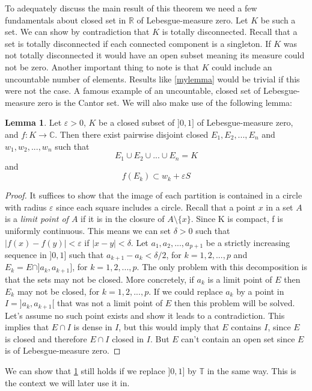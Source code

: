 \documentclass[a4paper,12pt,twoside,BCOR=10mm]{scrbook}
\theoremstyle{definition}
\theoremstyle{definition}
\newtheorem{lemma}[theorem]{Lemma}
\theoremstyle{definition}
\begin{document}
To adequately discuss the main result of this theorem we need a few fundamentals about closed set in $\mathbb{R}$ of Lebesgue-measure zero.
Let $K$ be such a set.
We can show by contradiction that $K$ is totally disconnected.
Recall that a set is totally disconnected if each connected component is a singleton.
If $K$ was not totally disconnected it would have an open subset meaning its measure could not be zero.
Another important thing to note is that $K$ could include an uncountable number of elements.
Results like \ref{mylemma} would be trivial if this were not the case.
A famous example of an uncountable, closed set of Lebesgue-measure zero is the Cantor set.
We will also make use of the following lemma:
\begin{lemma}
\label{somelemma}
Let
	$\varepsilon > 0$,
	$K$ be a closed subset of $]0, 1]$ of Lebesgue-measure zero,
	and $f: K \rightarrow \mathbb{C}$.
Then there exist pairwise disjoint closed $E_1, E_2, ..., E_n$ and $w_1, w_2, ..., w_n$ such that 
\[
	E_1 \cup E_2 \cup ... \cup E_n = K
\]
and
\[
	f(E_k) \subset w_k + \varepsilon S \tag*{$k = 1, 2, ..., n$.}
\]
\end{lemma}
\begin{proof}
It suffices to show that the image of each partition is contained in a circle with radius $\varepsilon$ since each square includes a circle.
Recall that a point $x$ in a set $A$ is a \emph{limit point of $A$} if it is in the closure of $A \setminus \{x\}$.
Since K is compact, f is uniformly continuous.
This means we can set $\delta > 0$ such that $|f(x) - f(y)| < \varepsilon$ if $|x - y| < \delta$.
Let $a_1, a_2, ..., a_{p + 1}$ be a strictly increasing sequence in $]0, 1]$ such that $a_{k + 1} - a_k < \delta/2$, for $k = 1, 2, ..., p$ and $E_k = E \cap ]a_k, a_{k + 1}]$, for $k = 1, 2, ..., p$.
The only problem with this decomposition is that the sets may not be closed.
More concretely, if $a_k$ is a limit point of $E$ then $E_k$ may not be closed, for $k = 1, 2, ..., p$.
If we could replace $a_k$ by a point in $I = ]a_k, a_{k + 1}[$ that was not a limit point of $E$ then this problem will be solved.
Let's assume no such point exists and show it leads to a contradiction.
This implies that $E \cap I$ is dense in $I$, but this would imply that $E$ contains $I$, since $E$ is closed and therefore $E \cap I$ closed in $I$.
But $E$ can't contain an open set since $E$ is of Lebesgue-measure zero.
\end{proof}
We can show that \ref{somelemma} still holds if we replace $]0, 1]$ by $\mathbb{T}$ in the same way.
This is the context we will later use it in.
\end{document}
